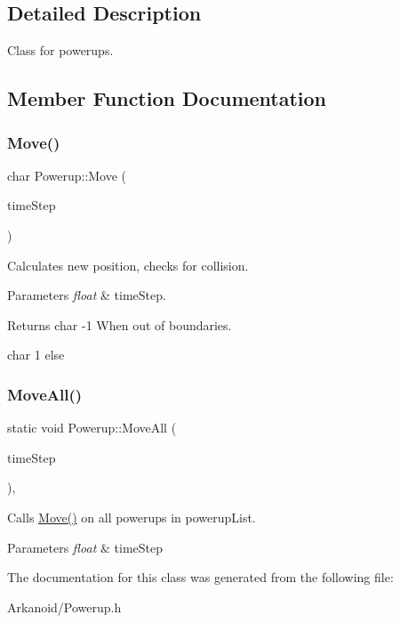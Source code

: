 \subsection{Detailed Description}
Class for powerups. 

\subsection{Member Function Documentation}
\mbox{\label{class_powerup_a5e81fffa256f0f339c4ac430d897a1ae}} 
\subsubsection{\texorpdfstring{Move()}{Move()}}
{\footnotesize\ttfamily char Powerup\+::\+Move (\begin{DoxyParamCaption}\item[{float}]{time\+Step }\end{DoxyParamCaption})\hspace{0.3cm}{\ttfamily [inline]}}



Calculates new position, checks for collision. 


\begin{DoxyParams}{Parameters}
{\em float} & time\+Step.\\
\hline
\end{DoxyParams}
\begin{DoxyReturn}{Returns}
char -\/1 When out of boundaries. 

char 1 else 
\end{DoxyReturn}
\mbox{\label{class_powerup_a0a9b0365e47a25e5bee5112357d7d1cd}} 
\subsubsection{\texorpdfstring{Move\+All()}{MoveAll()}}
{\footnotesize\ttfamily static void Powerup\+::\+Move\+All (\begin{DoxyParamCaption}\item[{float}]{time\+Step }\end{DoxyParamCaption})\hspace{0.3cm}{\ttfamily [inline]}, {\ttfamily [static]}}



Calls \hyperlink{class_powerup_a5e81fffa256f0f339c4ac430d897a1ae}{Move()} on all powerups in powerup\+List. 


\begin{DoxyParams}{Parameters}
{\em float} & time\+Step \\
\hline
\end{DoxyParams}


The documentation for this class was generated from the following file\+:\begin{DoxyCompactItemize}
\item 
Arkanoid/Powerup.\+h\end{DoxyCompactItemize}
